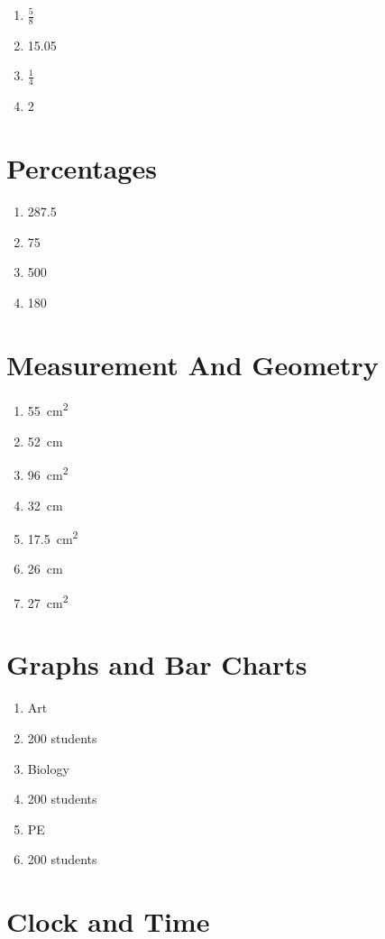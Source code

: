 \documentclass[10pt,a4paper]{article}
\begin{document}
\begin{enumerate}
\item $\frac{5}{8}$
\item 15.05
\item $\frac{1}{4}$
\item 2
\end{enumerate}


\section *{Percentages}

\begin{enumerate}
\item 287.5
\item 75
\item 500
\item 180
\end{enumerate}

\section *{Measurement And Geometry}

\begin{enumerate}
\item \SI{55}{\centi\metre\squared}
\item \SI{52}{\centi\metre}
\item \SI{96}{\centi\metre\squared}
\item \SI{32}{\centi\metre}
\item \SI{17.5}{\centi\metre\squared}
\item \SI{26}{\centi\metre}
\item \SI{27}{\centi\metre\squared}
\end{enumerate}


\section *{Graphs and Bar Charts}

\begin{enumerate}
\item Art
\item 200 students
\item Biology
\item 200 students
\item PE
\item 200 students
\end{enumerate}

\section *{Clock and Time}
\end{document}
